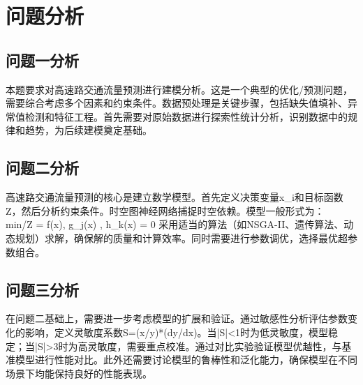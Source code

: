 \newpage
\section{问题分析}

\subsection{问题一分析}
本题要求对高速路交通流量预测进行建模分析。这是一个典型的优化/预测问题，需要综合考虑多个因素和约束条件。数据预处理是关键步骤，包括缺失值填补、异常值检测和特征工程。首先需要对原始数据进行探索性统计分析，识别数据中的规律和趋势，为后续建模奠定基础。

\subsection{问题二分析}
高速路交通流量预测的核心是建立数学模型。首先定义决策变量x_i和目标函数Z，然后分析约束条件。时空图神经网络捕捉时空依赖。模型一般形式为：
\\min/\max \quad Z = f(x), \quad {} \quad g_j(x) , \; h_k(x) = 0
采用适当的算法（如NSGA-II、遗传算法、动态规划）求解，确保解的质量和计算效率。同时需要进行参数调优，选择最优超参数组合。

\subsection{问题三分析}
在问题二基础上，需要进一步考虑模型的扩展和验证。通过敏感性分析评估参数变化的影响，定义灵敏度系数S=(x/y)*(dy/dx)。当|S|<1时为低灵敏度，模型稳定；当|S|>3时为高灵敏度，需要重点校准。通过对比实验验证模型优越性，与基准模型进行性能对比。此外还需要讨论模型的鲁棒性和泛化能力，确保模型在不同场景下均能保持良好的性能表现。